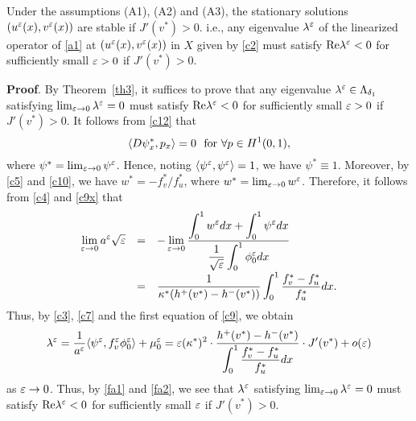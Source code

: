 \documentclass[a4,10pt]{article}
\begin{document}
\begin{theo}\label{th4}
Under the assumptions (A1), (A2) and (A3), the stationary solutions
$(u^\varepsilon(x), v^\varepsilon(x))$ are stable if $J'(v^*) > 0$. i.e., any eigenvalue $\lambda^\varepsilon$
of the linearized operator of \eqref{a1} at $(u^\varepsilon(x), v^\varepsilon(x))$ in $X$ given by \eqref{c2}
must satisfy $\text{Re}\lambda^\varepsilon < 0$ for sufficiently small $\varepsilon  > 0$ if $J'(v^*) > 0$.
\end{theo}

{\bf Proof}.
By Theorem~\ref{th3}, it suffices to prove that 
any eigenvalue
$\lambda^\varepsilon \in \Lambda_{\delta_1}$ satisfying
$\lim_{\varepsilon \to 0} \lambda^\varepsilon = 0$ must satisfy 
$\text{Re}\lambda^\varepsilon < 0$ for sufficiently small $\varepsilon  > 0$ if $J'(v^*) > 0$.
It follows from \eqref{c12} that
%
$$
\langle D \psi^*_{x}, p_x \rangle = 0 \ \ \text{for} \  \forall p \in H^1(0,1),
$$
%
where $\psi^* = \lim_{\varepsilon \to 0} \psi^\varepsilon$.
Hence, noting $\langle \psi^\varepsilon, \psi^\varepsilon \rangle = 1$, we have $\psi^* \equiv 1$. 
Moreover, by \eqref{c5} and \eqref{c10}, we have $w^* = - f^*_v/f^*_u$, where
$w^* = \lim_{\varepsilon \to 0} w^\varepsilon$. Therefore, it follows from 
\eqref{c4} and \eqref{c9x} that
%
$$
\begin{array}{rcl}
\displaystyle\lim_{\varepsilon \to 0} a^\varepsilon \sqrt{\varepsilon} & = & - \displaystyle\lim_{\varepsilon \to 0} 
\displaystyle\frac{  \displaystyle\int_0^1 w^\varepsilon dx  +   \int_0^1 \psi^\varepsilon dx }
{ \displaystyle\frac{1}{\sqrt{\varepsilon}} \int_0^1 \phi_0^\varepsilon dx }
\\[5ex]
& = &
 \displaystyle\frac{1 }
{ \kappa^* (h^+(v^*) - h^-(v^*))}  \int_0^1 \displaystyle\frac{f_v^* - f_u^*}{f_u^*} dx.
\end{array}
$$
%
Thus, by \eqref{c3}, \eqref{c7} and the first equation of \eqref{c9}, we obtain
%
\begin{equation}\label{cri}
\lambda^\varepsilon = \frac{1}{a^\varepsilon} \langle \psi^\varepsilon, f_v^\varepsilon \phi^\varepsilon_0 \rangle + \mu_0^\varepsilon = 
 \varepsilon (\kappa^*)^2 \cdot \displaystyle\frac{ h^+(v^*) - h^-(v^*) }{  \displaystyle\int_0^1 \displaystyle\frac{f_v^* - f_u^*}{f_u^*} dx } 
\cdot J'(v^*) + o(\varepsilon)
\end{equation}
%
as $\varepsilon \to 0$. 
Thus, by \eqref{fa1} and \eqref{fa2}, we see that
$\lambda^\varepsilon$ satisfying
$\lim_{\varepsilon \to 0} \lambda^\varepsilon = 0$
must satisfy $\mbox{\rm Re} \lambda^\varepsilon < 0$ for 
sufficiently small $\varepsilon$ if $J'(v^*) > 0$.
\Qed
\end{document}
